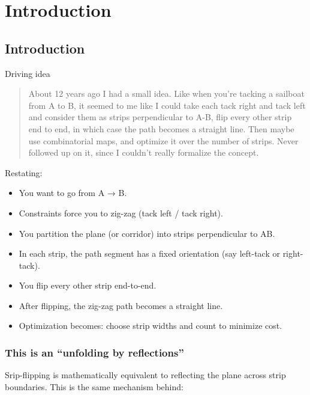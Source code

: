  

\chapter[Introduction]{Introduction}



\section{Introduction}

Driving idea 
\begin{quote}

About 12 years ago I had a small idea. Like when you're tacking a sailboat from A to B, it seemed to me like I could take each tack right and tack left and consider them as strips perpendicular to A-B, flip every other strip end to end, in which case the path becomes a straight line. Then maybe use combinatorial maps, and optimize it over the number of strips. Never followed up on it, since I couldn't really formalize the concept.

\end{quote}

Restating:

\begin{itemize}
\item You want to go from A → B.
\item Constraints force you to zig-zag (tack left / tack right).
\item You partition the plane (or corridor) into strips perpendicular to AB.
\item In each strip, the path segment has a fixed orientation (say left-tack or right-tack).
\item You flip every other strip end-to-end.
\item After flipping, the zig-zag path becomes a straight line.
\item Optimization becomes:
choose strip widths and count to minimize cost.

\end{itemize}


\subsection{This is an “unfolding by reflections”}
Srip-flipping is mathematically equivalent to reflecting the plane across strip boundaries.
This is the same mechanism behind:

